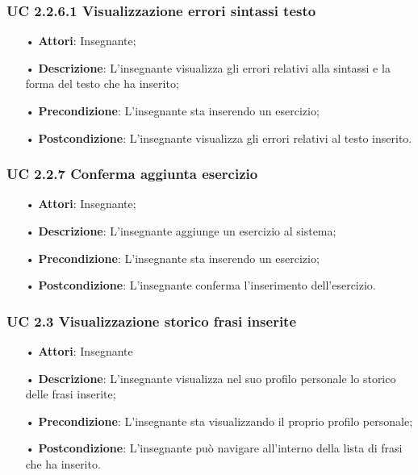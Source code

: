 \subsubsection{UC 2.2.6.1 Visualizzazione errori sintassi testo}
\begin{itemize}
	\item[•] \textbf{Attori}: Insegnante;
	\item[•] \textbf{Descrizione}: L'insegnante visualizza gli errori relativi alla sintassi e la forma del testo che ha inserito;
	\item[•] \textbf{Precondizione}: L'insegnante sta inserendo un esercizio;
	\item[•] \textbf{Postcondizione}: L’insegnante visualizza gli errori relativi al testo inserito.
\end{itemize}

\subsubsection{UC 2.2.7 Conferma aggiunta esercizio}
\begin{itemize}
	\item[•] \textbf{Attori}: Insegnante;
	\item[•] \textbf{Descrizione}: L'insegnante aggiunge un esercizio al sistema;
	\item[•] \textbf{Precondizione}: L’insegnante sta inserendo un esercizio;
	\item[•] \textbf{Postcondizione}: L'insegnante conferma l'inserimento dell'esercizio.
\end{itemize}






\subsubsection{UC 2.3 Visualizzazione storico frasi inserite}


\begin{itemize}
	\item[•] \textbf{Attori}: Insegnante	   
	\item[•] \textbf{Descrizione}: L’insegnante visualizza nel suo profilo personale lo storico delle frasi inserite; 
	\item[•] \textbf{Precondizione}: L'insegnante sta visualizzando il proprio profilo personale;
	\item[•] \textbf{Postcondizione}: L’insegnante può navigare all’interno della lista di frasi che ha inserito.
\end{itemize}

